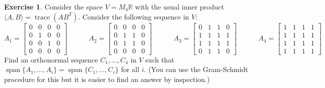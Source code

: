 \documentclass{amsart}
\newcommand{\R}         {{\mathbb{R}}}
\newcommand{\trc}       {\operatorname{trace}}
\newcommand{\spn}       {\operatorname{span}}
\newcommand{\bsm}       {\left[\begin{smallmatrix}}
\newcommand{\esm}       {\end{smallmatrix}\right]}
\newcommand{\ip}[1]     {\langle #1\rangle}
\renewcommand{\:}       {\colon}
\theoremstyle{definition}
\newtheorem{exercise}{Exercise}[section]
\begin{document}
\begin{exercise}
 Consider the space $V=M_4\R$ with the usual inner product
 $\ip{A,B}=\trc(AB^T)$.  Consider the following sequence in
 $V$:
 {\tiny \[
  A_1 = \bsm 0&0&0&0\\ 0&1&0&0\\ 0&0&1&0\\ 0&0&0&0\esm 
  \hspace{3em}
  A_2 = \bsm 0&0&0&0\\ 0&1&1&0\\ 0&1&1&0\\ 0&0&0&0\esm 
  \hspace{3em}
  A_3 = \bsm 0&1&1&0\\ 1&1&1&1\\ 1&1&1&1\\ 0&1&1&0\esm 
  \hspace{3em}
  A_4 = \bsm 1&1&1&1\\ 1&1&1&1\\ 1&1&1&1\\ 1&1&1&1\esm 
 \]}
 Find an orthonormal sequence $C_1,\dotsc,C_4$ in $V$ such
 that $\spn\{A_1,\dotsc,A_i\}=\spn\{C_1,\dotsc,C_i\}$ for
 all $i$.  (You can use the Gram-Schmidt procedure for this
 but it is easier to find an answer by inspection.)
\end{exercise}
\end{document}

